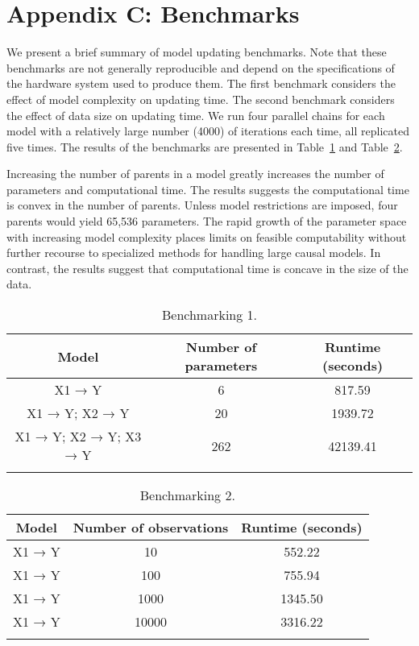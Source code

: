 \documentclass[
  11pt,
  article]{jss}
\begin{document}
\newpage{}

\section*{Appendix C: Benchmarks}\label{sec-benchmark}

We present a brief summary of model updating benchmarks. Note that these
benchmarks are not generally reproducible and depend on the
specifications of the hardware system used to produce them. The first
benchmark considers the effect of model complexity on updating time. The
second benchmark considers the effect of data size on updating time. We
run four parallel chains for each model with a relatively large number
(4000) of iterations each time, all replicated five times. The results
of the benchmarks are presented in Table~\ref{tbl-bench1} and
Table~\ref{tbl-bench2}.

Increasing the number of parents in a model greatly increases the number
of parameters and computational time. The results suggests the
computational time is convex in the number of parents. Unless model
restrictions are imposed, four parents would yield 65,536 parameters.
The rapid growth of the parameter space with increasing model complexity
places limits on feasible computability without further recourse to
specialized methods for handling large causal models. In contrast, the
results suggest that computational time is concave in the size of the
data.

\begin{longtable}{ccc}

\toprule
Model & Number of parameters & Runtime (seconds)\\
\midrule
X1 → Y & 6 & 817.59\\
X1 → Y; X2 → Y & 20 & 1939.72\\
X1 → Y; X2 → Y; X3 → Y & 262 & 42139.41\\
\bottomrule


\caption{\label{tbl-bench1}Benchmarking 1.}

\tabularnewline
\end{longtable}

\begin{longtable}{ccc}

\toprule
Model & Number of observations & Runtime (seconds)\\
\midrule
X1 → Y & 10 & 552.22\\
X1 → Y & 100 & 755.94\\
X1 → Y & 1000 & 1345.50\\
X1 → Y & 10000 & 3316.22\\
\bottomrule


\caption{\label{tbl-bench2}Benchmarking 2.}

\tabularnewline
\end{longtable}

\newpage{}
\end{document}
